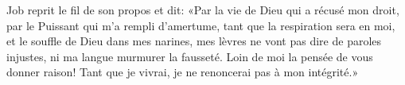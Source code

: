 Job reprit le fil de son propos et dit:
«Par la vie de Dieu qui a récusé mon droit, par le Puissant qui m’a rempli d’amertume,
	tant que la respiration sera en moi, et le souffle de Dieu dans mes narines,
	mes lèvres ne vont pas dire de paroles injustes, ni ma langue murmurer la fausseté.
Loin de moi la pensée de vous donner raison!
	Tant que je vivrai, je ne renoncerai pas à mon intégrité.»

